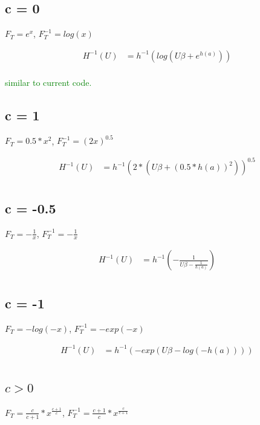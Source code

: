 \documentclass[]{article}
\begin{document}
\subsection{c = 0}

$F_T = e^x$, $F_T^{-1} = log(x)$

\begin{align*}
H^{-1}(U) &= h^{-1} \left( log \left( U\beta + e^{h(a)} \right) \right) \\
\end{align*}

\textcolor{green}{similar to current code.}

\subsection{c = 1}

$F_T = 0.5 * x^2$, $F_T^{-1} = (2x)^{0.5}$

\begin{align*}
H^{-1}(U) &= h^{-1} \left( 2 * \left( U\beta + (0.5 *h(a))^{2} \right) \right)^{0.5} \\
\end{align*}

\subsection{c = -0.5}

$F_T = -\frac{1}{x}$, $F_T^{-1} = - \frac{1}{x}$

\begin{align*}
H^{-1}(U) &= h^{-1} \left( - \frac{1}{U\beta - \frac{1}{h(a)}} \right) \\
\end{align*}


\subsection{c = -1}

$F_T =-log(-x)$, $F_T^{-1} = -exp(-x)$

\begin{align*}
H^{-1}(U) &= h^{-1} \left( - exp \left( U\beta - log(-h(a)) \right) \right) \\
\end{align*}


\subsection{$c > 0$}

$F_T = \frac{c}{c + 1} * x^{\frac{c + 1}{c}}$,
$F_T^{-1} = \frac{c + 1}{c} * x^{\frac{c}{c + 1}}$
\end{document}
